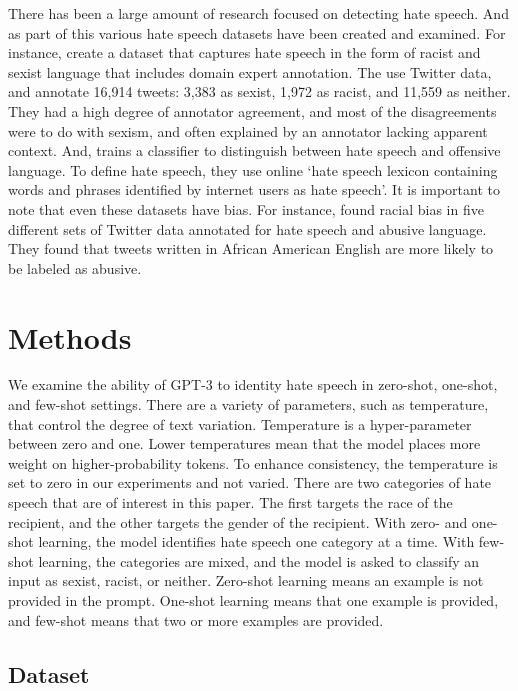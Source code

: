 \documentclass{bmcart}
\begin{document}
There has been a large amount of research focused on detecting hate speech. And as part of this various hate speech datasets have been created and examined. For instance, \cite{waseem2016hateful} create a dataset that captures hate speech in the form of racist and sexist language that includes domain expert annotation. The use Twitter data, and annotate 16,914 tweets: 3,383 as sexist, 1,972 as racist, and 11,559 as neither. They had a high degree of annotator agreement, and most of the disagreements were to do with sexism, and often explained by an annotator lacking apparent context. And, \cite{davidson2017automated} trains a classifier to distinguish between hate speech and offensive language. To define hate speech, they use online `hate speech lexicon containing words and phrases identified by internet users as hate speech'. It is important to note that even these datasets have bias. For instance, \cite{davidson2019racial} found racial bias in five different sets of Twitter data annotated for hate speech and abusive language. They found that tweets written in African American English are more likely to be labeled as abusive.

\section{Methods}\label{methods}

We examine the ability of GPT-3 to identity hate speech in zero-shot, one-shot, and few-shot settings. There are a variety of parameters, such as temperature, that control the degree of text variation. Temperature is a hyper-parameter between zero and one. Lower temperatures mean that the model places more weight on higher-probability tokens. To enhance consistency, the temperature is set to zero in our experiments and not varied. There are two categories of hate speech that are of interest in this paper. The first targets the race of the recipient, and the other targets the gender of the recipient. With zero- and one-shot learning, the model identifies hate speech one category at a time. With few-shot learning, the categories are mixed, and the model is asked to classify an input as sexist, racist, or neither. Zero-shot learning means an example is not provided in the prompt. One-shot learning means that one example is provided, and few-shot means that two or more examples are provided.

\subsection{Dataset}\label{dataset}
\end{document}
